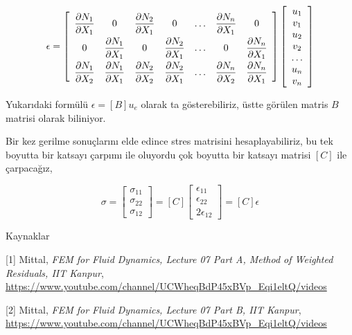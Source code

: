 \documentclass[12pt,fleqn]{article}\usepackage{../../common}
\begin{document}
$$
\renewcommand*{\arraystretch}{2.0}
\epsilon =
\left[\begin{array}{ccccccc}
\dfrac{\partial N_1}{\partial X_1} & 0 &
\dfrac{\partial N_2}{\partial X_1} & 0 & \dots &
\dfrac{\partial N_n}{\partial X_1} & 0  \\
0 & \dfrac{\partial N_1}{\partial X_1} &
0 & \dfrac{\partial N_2}{\partial X_1} & \dots &
0 & \dfrac{\partial N_n}{\partial X_1}  \\
\dfrac{\partial N_1}{\partial X_2} & \dfrac{\partial N_1}{\partial X_1} & 
\dfrac{\partial N_2}{\partial X_2} & \dfrac{\partial N_2}{\partial X_1} & \dots &
\dfrac{\partial N_n}{\partial X_2} & \dfrac{\partial N_n}{\partial X_1} 
\end{array}\right]
\renewcommand*{\arraystretch}{1.0}
\left[\begin{array}{c}
u_1 \\ v_1 \\ u_2 \\ v_2 \\ \dots \\ u_n \\ v_n
\end{array}\right]
$$

Yukarıdaki formülü $\epsilon = [B] u_e$ olarak ta gösterebiliriz, üstte görülen
matris $B$ matrisi olarak biliniyor.

Bir kez gerilme sonuçlarını elde edince stres matrisini hesaplayabiliriz, bu tek
boyutta bir katsayı çarpımı ile oluyordu çok boyutta bir katsayı matrisi $[C]$
ile çarpacağız,

$$
\sigma = \left[\begin{array}{c}
\sigma_{11} \\ \sigma_{22} \\ \sigma_{12}
\end{array}\right] =
[C] \left[\begin{array}{c}
\epsilon_{11} \\ \epsilon_{22} \\ 2 \epsilon_{12}
\end{array}\right] = [C] \epsilon
$$

Kaynaklar

[1] Mittal, {\em FEM for Fluid Dynamics, Lecture 07 Part A, Method of Weighted Residuals, IIT Kanpur},
    \url{https://www.youtube.com/channel/UCWheqBdP45xBVp_Eqi1eltQ/videos}

[2] Mittal, {\em FEM for Fluid Dynamics, Lecture 07 Part B, IIT Kanpur},
    \url{https://www.youtube.com/channel/UCWheqBdP45xBVp_Eqi1eltQ/videos}
\end{document}
